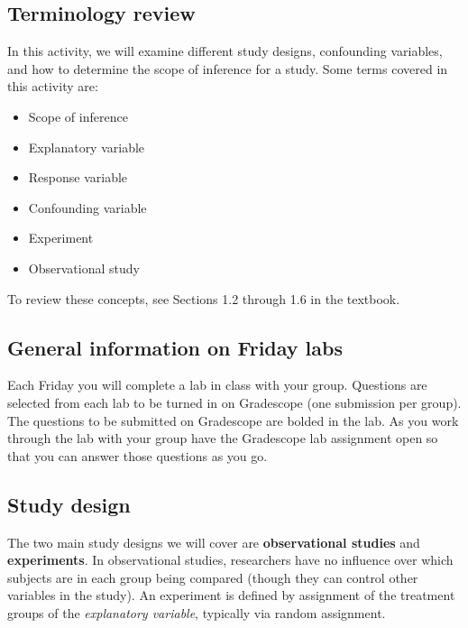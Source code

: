 \documentclass[
]{report}
\begin{document}
\hypertarget{terminology-review-3}{%
\subsection{Terminology review}\label{terminology-review-3}}

In this activity, we will examine different study designs, confounding variables, and how to determine the scope of inference for a study. Some terms covered in this activity are:

\begin{itemize}
\item
  Scope of inference
\item
  Explanatory variable
\item
  Response variable
\item
  Confounding variable
\item
  Experiment
\item
  Observational study
\end{itemize}

To review these concepts, see Sections 1.2 through 1.6 in the textbook.

\hypertarget{general-information-on-friday-labs-1}{%
\subsection{General information on Friday labs}\label{general-information-on-friday-labs-1}}

Each Friday you will complete a lab in class with your group. Questions are selected from each lab to be turned in on Gradescope (one submission per group). The questions to be submitted on Gradescope are bolded in the lab. As you work through the lab with your group have the Gradescope lab assignment open so that you can answer those questions as you go.

\hypertarget{study-design-1}{%
\subsection{Study design}\label{study-design-1}}

The two main study designs we will cover are \textbf{observational studies} and \textbf{experiments}. In observational studies, researchers have no influence over which subjects are in each group being compared (though they can control other variables in the study). An experiment is defined by assignment of the treatment groups of the \emph{explanatory variable}, typically via random assignment.
\end{document}
